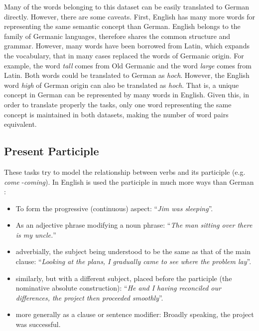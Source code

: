 Many of the words belonging to this dataset can be easily translated to
German directly. However, there are some caveats. First, English has many
more words for representing the same semantic concept than German.  English
belongs to the family of Germanic languages, therefore shares the common structure
and grammar. However, many words have been borrowed from Latin, which expands
the vocabulary, that in many cases replaced the words of Germanic origin. 
For example, the word \textit{tall}  comes from Old Germanic and  the
word \textit{large} comes from Latin. Both words could be translated to
German as \textit{hoch}. However, the English word  \textit{high} of German
origin can also be translated as \textit{hoch}. 
That is, a unique concept in German can be represented by many words in English. 
Given this, in order to translate properly the tasks, only one word representing 
the same concept is maintained in both datasets, making the number of word pairs equivalent.


%
\subsection{Present Participle}
\label{sec:sub_sec_present_participle}

These tasks try to model the relationship between verbs and its participle
(e.g. \textit{come} -\textit{coming}). In English is used the participle in
much more ways than German \cite{dictionaries1996american}: 

\begin{itemize}
\item  To form the progressive (continuous) aspect: ``\textit{Jim was sleeping}''.
\item As an   adjective phrase modifying a noun phrase: ``\textit{The man sitting over there is my
  uncle.}''
\item adverbially, the subject being understood to be the same as that
  of the main clause: ``\textit{Looking at the plans, I gradually came to see where the
  problem lay}''.
\item  similarly, but with a different subject, placed before the
  participle (the nominative absolute construction): ``\textit{He and I having
  reconciled our differences, the project then proceeded smoothly}''.
\item more
  generally as a clause or sentence modifier: Broadly speaking, the project
  was successful.

\end{itemize}

